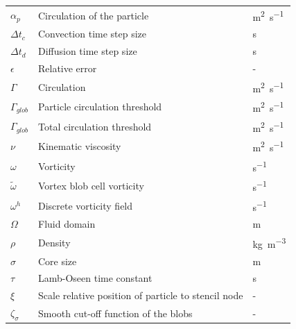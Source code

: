 {\renewcommand{\arraystretch}{1.2} %
\begin{longtable}{p{1.5cm}p{10.5cm}p{1.5cm}}
	$\alpha_p$ 		& Circulation of the particle & \si{m^2.s^{-1}}\\

	$\Delta t_c$ 		& Convection time step size & \si{s}\\
	$\Delta t_d$ 		& Diffusion time step size & \si{s}\\	

	$\epsilon$ 		& Relative error & -\\		

	$\Gamma$ 		& Circulation & \si{m^2.s^{-1}}\\	
	$\Gamma_{glob}$ 		& Particle circulation threshold & \si{m^2.s^{-1}}\\	
	$\Gamma_{glob}$ 		& Total circulation threshold & \si{m^2.s^{-1}}\\		

	$\nu$ & Kinematic viscosity & \si{m^2.s^{-1}}\\

	$\omega$ & Vorticity & \si{s^{-1}}\\
	$\tilde{\omega}$ & Vortex blob cell vorticity & \si{s^{-1}}\\
	$\omega^h$ & Discrete vorticity field & \si{s^{-1}}\\

	$\Omega$ & Fluid domain & \si{m}\\

	$\rho$ & Density & \si{kg.m^{-3}}\\
	
	$\sigma$ & Core size & \si{m}\\
	$\tau$ & Lamb-Oseen time constant & \si{s}\\
	$\xi$ & Scale relative position of particle to stencil node & -\\
	$\zeta_{\sigma}$		& Smooth cut-off function of the blobs & -\\			

\end{longtable}}

